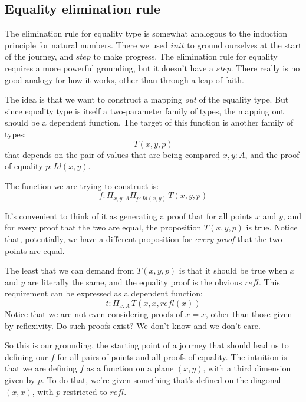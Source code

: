 \documentclass[DaoFP]{subfiles}
\begin{document}
\subsection{Equality elimination rule}

The elimination rule for equality type is somewhat analogous to the induction principle for natural numbers. There we used $\mathit{init}$ to ground ourselves at the start of the journey, and $\mathit{step}$ to make progress. The elimination rule for equality requires a more powerful grounding, but it doesn't have a $\mathit{step}$. There really is no good analogy for how it works, other than through a leap of faith.

The idea is that we want to construct a mapping \emph{out} of the equality type. But since equality type is itself a two-parameter family of types, the mapping out should be a dependent function. The target of this function is another family of types:
\[T(x, y, p)\]
 that depends on the pair of values that are being compared $x, y \colon A$, and the proof of equality $p \colon \mathit{Id}(x, y)$.
 
 The function we are trying to construct is:
 \[ f \colon \Pi_{x, y : A} \Pi_{p : \mathit{Id}(x, y)} \, T(x, y, p) \]

It's convenient to think of it as generating a proof that for all points $x$ and $y$, and for every proof that the two are equal, the proposition $T(x, y, p)$ is true. Notice that, potentially, we have a different proposition for \emph{every proof} that the two points are equal.

The least that we can demand from $T(x, y, p)$ is that it should be true when $x$ and $y$ are literally the same, and the equality proof is the obvious $\mathit{refl}$. This requirement can be expressed as a dependent function:
\[t \colon \Pi_{x : A} \,T\left(x, x, \mathit{refl}(x)\right)\]
Notice that we are not even considering proofs of $x = x$, other than those given by reflexivity. Do such proofs exist? We don't know and we don't care.

So this is our grounding, the starting point of a journey that should lead us to defining our $f$ for all pairs of points and all proofs of equality. The intuition is that we are defining $f$ as a function on a plane $(x, y)$, with a third dimension given by $p$. To do that, we're given something that's defined on the diagonal $(x, x)$, with $p$ restricted to $\mathit{refl}$.
\end{document}
